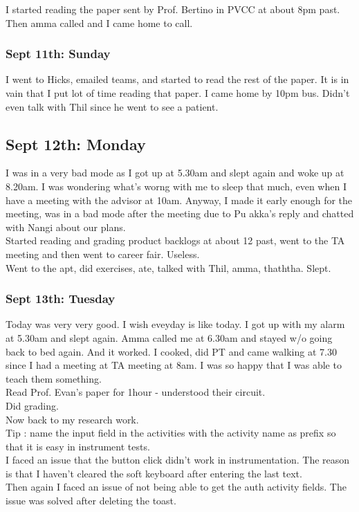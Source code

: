 \documentclass[11pt]{article}
\begin{document}
I started reading the paper sent by Prof. Bertino in PVCC at about 8pm past. Then amma called and I came home to call.

\subsubsection*{Sept 11th: Sunday}
I went to Hicks, emailed teams, and started to read the rest of the paper. It is in vain that I put lot of time reading that paper. I came home by 
10pm bus. Didn't even talk with Thil since he went to see a patient.

\subsection*{Sept 12th: Monday}
I was in a very bad mode as I got up at 5.30am and slept again and woke up at 8.20am. I was wondering what's worng with me to sleep that much, even 
when I have a meeting with the advisor at 10am.
Anyway, I made it early enough for the meeting, was in a bad mode after the meeting due to Pu akka's reply and chatted with Nangi about our plans.\\
Started reading and grading product backlogs at about 12 past, went to the TA meeting and then went to career fair. Useless.\\
Went to the apt, did exercises, ate, talked with Thil, amma, thaththa. Slept.\\

\subsubsection*{Sept 13th: Tuesday}
Today was very very good. I wish eveyday is like today. I got up with my alarm at 5.30am and slept again. Amma called me at 6.30am and stayed w/o 
going back to bed again. And it worked. I cooked, did PT and came walking at 7.30 since I had a meeting at TA meeting at 8am. I was so happy that I 
was able to teach them something.\\
Read Prof. Evan's paper for 1hour - understood their circuit.\\
Did grading.\\
Now back to my research work.\\

Tip : name the input field in the activities with the activity name as prefix so that it is easy in instrument tests.\\

I faced an issue that the button click didn't work in instrumentation. The reason is that I haven't cleared the soft keyboard after entering the last 
text.\\
Then again I faced an issue of not being able to get the auth activity fields. The issue was solved after deleting the toast.\\
\end{document}
